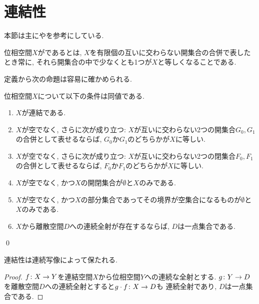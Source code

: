 \documentclass[uplatex, dvipdfmx, a4paper, 12pt, class=jsbook, crop=false]{standalone}
\begin{document}
\section{連結性}
\label{sec:connected-spaces}

\begin{source}
	本節は主に\cite[Chapter 6]{Engelking1989GT}や\cite[第４章]{Morita1981ja}を参考にしている.
\end{source}

\begin{definition}
	位相空間$ X $がであるとは, $ X $を有限個の互いに交わらない開集合の合併で表したとき常に,
	それら開集合の中で少なくとも1つが$ X $と等しくなることである.
\end{definition}

定義から次の命題は容易に確かめられる.
\begin{proposition}
	\label{prop:Characterization of connectedness}
	位相空間$ X $について以下の条件は同値である.
		\begin{enumerate}
			\item $ X $が連結である.
			\item $ X $が空でなく, さらに次が成り立つ: $ X $が互いに交わらない2つの開集合$ G_0, G_1 $の合併として表せるならば,
			      $ G_0 $か$ G_1 $のどちらかが$ X $に等しい.
			\item $ X $が空でなく, さらに次が成り立つ: $ X $が互いに交わらない2つの閉集合$ F_0, F_1 $の合併として表せるならば,
			$ F_0 $か$ F_1 $のどちらかが$ X $に等しい.
			\item $ X $が空でなく, かつ$ X $の開閉集合が$ \emptyset $と$ X $のみである.
			\item $ X $が空でなく, かつ$ X $の部分集合であってその境界が空集合になるものが$ \emptyset $と$ X $のみである.
			\item $ X $から離散空間$ D $への連続全射が存在するならば, $ D $は一点集合である.
		\end{enumerate}
		\qed
\end{proposition}

\begin{proposition}
	\label{prop:Continuous maps preserve connectedness}
	連結性は連続写像によって保たれる.
\end{proposition}

\begin{proof}
	$ f\colon X\to Y $を連結空間$ X $から位相空間$ Y $への連続な全射とする.
	$ g\colon Y\to D $を離散空間$ D $への連続全射とすると$ g \cdot f\colon X\to D $も
	連続全射であり, $ D $は一点集合である.
\end{proof}
\end{document}
